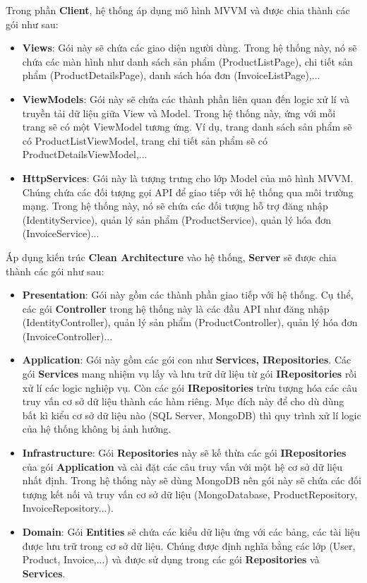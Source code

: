 \documentclass[../DoAn.tex]{subfiles}
\begin{document}
Trong phần \textbf{Client}, hệ thống áp dụng mô hình MVVM và được chia thành các gói như sau:
\begin{itemize}
    \item \textbf{Views}: Gói này sẽ chứa các giao diện người dùng. Trong hệ thống này, nó sẽ chứa các màn hình như danh sách sản phẩm (ProductListPage), chi tiết sản phẩm (ProductDetailsPage), danh sách hóa đơn (InvoiceListPage),...
    \item \textbf{ViewModels}: Gói này sẽ chứa các thành phần liên quan đến logic xử lí và truyền tải dữ liệu giữa View và Model. Trong hệ thống này, ứng với mỗi trang sẽ có một ViewModel tương ứng. Ví dụ, trang danh sách sản phẩm sẽ có ProductListViewModel, trang chi tiết sản phẩm sẽ có ProductDetailsViewModel,...
    \item \textbf{HttpServices}: Gói này là tượng trưng cho lớp Model của mô hình MVVM. Chúng chứa các đối tượng gọi API để giao tiếp với hệ thống qua môi trường mạng. Trong hệ thống này, nó sẽ chứa các đối tượng hỗ trợ đăng nhập (IdentityService), quản lý sản phẩm (ProductService), quản lý hóa đơn (InvoiceService)...
\end{itemize}

Áp dụng kiến trúc \textbf{Clean Architecture} vào hệ thống, \textbf{Server} sẽ được chia thành các gói như sau:
\begin{itemize}
    \item \textbf{Presentation}: Gói này gồm các thành phần giao tiếp với hệ thống. Cụ thể, các gói \textbf{Controller} trong hệ thống này là các đầu API như đăng nhập (IdentityController), quản lý sản phẩm (ProductController), quản lý hóa đơn (InvoiceController)...
    \item \textbf{Application}: Gói này gồm các gói con như \textbf{Services, IRepositories}. Các gói \textbf{Services} mang nhiệm vụ lấy và lưu trữ dữ liệu từ gói \textbf{IRepositories} rồi xử lí các logic nghiệp vụ. Còn các gói \textbf{IRepositories} trừu tượng hóa các câu truy vấn cơ sở dữ liệu thành các hàm riêng. Mục đích này để cho dù dùng bất kì kiểu cơ sở dữ liệu nào (SQL Server, MongoDB) thì quy trình xử lí logic của hệ thống không bị ảnh hưởng.
    \item \textbf{Infrastructure}: Gói \textbf{Repositories} này sẽ kế thừa các gói \textbf{IRepositories} của gói \textbf{Application} và cài đặt các câu truy vấn với một hệ cơ sở dữ liệu nhất định. Trong hệ thống này sẽ dùng MongoDB nên gói này sẽ chứa các đối tượng kết nối và truy vấn cơ sở dữ liệu (MongoDatabase, ProductRepository, InvoiceRepository...).
    \item \textbf{Domain}: Gói \textbf{Entities} sẽ chứa các kiểu dữ liệu ứng với các bảng, các tài liệu được lưu trữ trong cơ sở dữ liệu. Chúng được định nghĩa bằng các lớp (User, Product, Invoice,...) và được sử dụng trong các gói \textbf{Repositories} và \textbf{Services}.
\end{itemize}
\break
\end{document}
